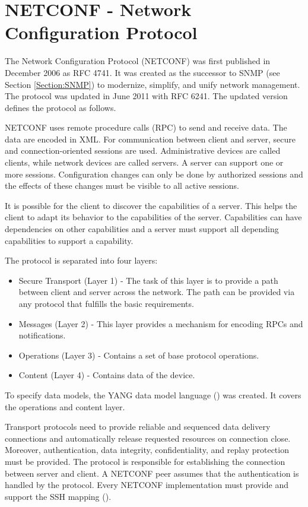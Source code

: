\newpage
\section{NETCONF - Network Configuration Protocol}
\label{Section:NETCONF}

The Network Configuration Protocol (NETCONF) was first published in December 2006 as RFC 4741\cite{RFC:RFC4741:2006}. It was created as the successor to SNMP (see Section \ref{Section:SNMP}) to modernize, simplify, and unify network management.  The protocol was updated in June 2011 with RFC 6241\cite{RFC:RFC6241:2011}. The updated version defines the protocol as follows.

NETCONF uses remote procedure calls (RPC) to send and receive data. The data are encoded in XML. For communication between client and server, secure and connection-oriented sessions are used. Administrative devices are called clients, while network devices are called servers. A server can support one or more sessions. Configuration changes can only be done by authorized sessions and the effects of these changes must be visible to all active sessions.

It is possible for the client to discover the capabilities of a server. This helps the client to adapt its behavior to the capabilities of the server. Capabilities can have dependencies on other capabilities and a server must support all depending capabilities to support a capability.

The protocol is separated into four layers:

\begin{minipage}{\textwidth}
\begin{itemize}
    \item Secure Transport (Layer 1) -  The task of this layer is to provide a path between client and server across the network. The path can be provided via any protocol that fulfills the basic requirements.
    \item Messages (Layer 2) - This layer provides a mechanism for encoding RPCs and notifications.
    \item Operations (Layer 3) - Contains a set of base protocol operations.
    \item Content (Layer 4) - Contains data of the device.
\end{itemize}
\end{minipage}

To specify data models, the YANG data model language (\cite{RFC:RFC6020:2010}) was created. It covers the operations and content layer.

Transport protocols need to provide reliable and sequenced data delivery connections and automatically release requested resources on connection close. Moreover, authentication, data integrity, confidentiality, and replay protection must be provided. The protocol is responsible for establishing the connection between server and client. A NETCONF peer assumes that the authentication is handled by the protocol. Every NETCONF implementation must provide and support the SSH mapping (\cite{RFC:RFC6242:2011}).